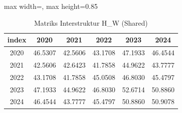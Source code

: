 \begin{table}[H]
\centering
\caption{Matriks Interstruktur H\_W (Shared)} \makeatletter{}\makeatother
\begin{adjustbox}{max width=\textwidth, max height=0.85\textheight}
\begin{tabular}{|c|c|c|c|c|c|}
\hline
\textbf{index} & \textbf{2020} & \textbf{2021} & \textbf{2022} & \textbf{2023} & \textbf{2024} \\
\hline
2020 & 46.5307 & 42.5606 & 43.1708 & 47.1933 & 46.4544 \\
2021 & 42.5606 & 42.6423 & 41.7858 & 44.9622 & 43.7777 \\
2022 & 43.1708 & 41.7858 & 45.0508 & 46.8030 & 45.4797 \\
2023 & 47.1933 & 44.9622 & 46.8030 & 52.6714 & 50.8860 \\
2024 & 46.4544 & 43.7777 & 45.4797 & 50.8860 & 50.9078 \\
\hline
\end{tabular}
\end{adjustbox}
\end{table}